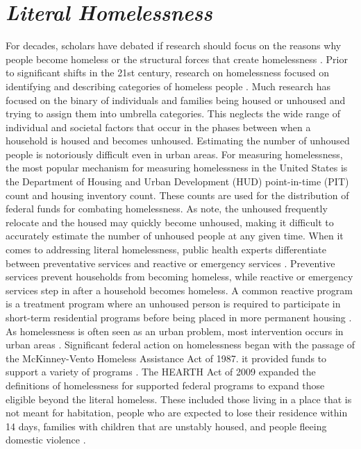\section{\textit{Literal Homelessness}}
For decades, scholars have debated if research should focus on the reasons why people become homeless or the structural forces that create homelessness \citep{shlay_social_2003}. Prior to significant shifts in the 21st century, research on homelessness focused on identifying and describing categories of homeless people \citep{lee_homelessness_2021}. Much research has focused on the binary of individuals and families being housed or unhoused and trying to assign them into umbrella categories. This neglects the wide range of individual and societal factors that occur in the phases between when a household is housed and becomes unhoused. Estimating the number of unhoused people is notoriously difficult even in urban areas. For measuring homelessness, the most popular mechanism for measuring homelessness in the United States is the Department of Housing and Urban Development (HUD) point-in-time (PIT) count and housing inventory count. These counts are used for the distribution of federal funds for combating homelessness. As \citet{agans_enumerating_2014}  note, the unhoused frequently relocate and the housed may quickly become unhoused, making it difficult to accurately estimate the number of unhoused people at any given time. When it comes to addressing literal homelessness, public health experts differentiate between preventative services and reactive or emergency services \citep{oregan_how_2021}. Preventive services prevent households from becoming homeless, while reactive or emergency services step in after a household becomes homeless. A common reactive program is a treatment program where an unhoused person is required to participate in short-term residential programs before being placed in more permanent housing \citep{evans_reducing_2019}. As homelessness is often seen as an urban problem, most intervention occurs in urban areas \citep{gleason_using_2021}. Significant federal action on homelessness began with the passage of the McKinney-Vento Homeless Assistance Act of 1987. it provided funds to support a variety of programs  \citep{evans_reducing_2019}. The HEARTH Act of 2009 expanded the definitions of homelessness for supported federal programs to expand those eligible beyond the literal homeless. These included those living in a place that is not meant for habitation, people who are expected to lose their residence within 14 days, families with children that are unstably housed, and people fleeing domestic violence  \citep{evans_reducing_2019}. %


